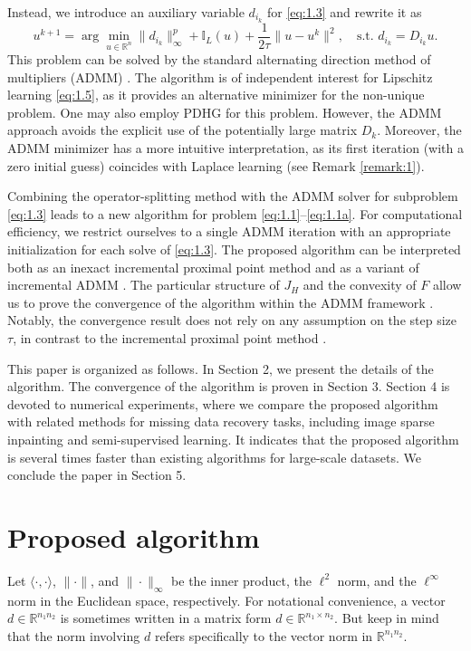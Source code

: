 \documentclass{article}
\theoremstyle{definition}
\begin{document}
Instead, we introduce an auxiliary variable $d_{i_k}$ for \eqref{eq:1.3} and rewrite it as
\begin{equation*}
  u^{k+1}=\arg\min_{u\in\mathbb{R}^n}\|d_{i_k}\|_\infty ^p
  +\mathbb{I}_{L}(u)
  +\frac{1}{2\tau}\|u-u^k\|^2,\quad \mbox{s.t. } d_{i_k}=D_{i_k} u.
\end{equation*}
This problem can be solved by the standard alternating direction method of multipliers (ADMM) \cite{boyd2011distributed}.
The algorithm is of independent interest for Lipschitz learning \eqref{eq:1.5}, as it provides an alternative minimizer for the non-unique problem.
One may also employ PDHG \cite{chambolle2011first} for this problem.
However, the ADMM approach avoids the explicit use of the potentially large matrix $D_k$.
Moreover, the ADMM minimizer has a more intuitive interpretation, as its first iteration (with a zero initial guess) coincides with Laplace learning (see Remark \ref{remark:1}).


Combining the operator-splitting method with the ADMM solver for subproblem \eqref{eq:1.3} leads to a new algorithm for problem \eqref{eq:1.1}--\eqref{eq:1.1a}.
For computational efficiency, we restrict ourselves to a single ADMM iteration with an appropriate initialization for each solve of \eqref{eq:1.3}.
The proposed algorithm can be interpreted both as an inexact incremental proximal point method \cite{bertsekas2011incremental} and as a variant of incremental ADMM \cite{zhang2011unified}.
The particular structure of $J_H$ and the convexity of $F$ allow us to prove the convergence of the algorithm within the ADMM framework \cite{zhang2011unified}.
Notably, the convergence result does not rely on any assumption on the step size $\tau$, in contrast to the incremental proximal point method \cite{bertsekas2011incremental}.


This paper is organized as follows. In Section 2, we present the details of the algorithm.
The convergence of the algorithm is proven in Section 3.
Section 4 is devoted to numerical experiments, where we compare the proposed algorithm with related methods for missing data recovery tasks, including image sparse inpainting and semi-supervised learning.
It indicates that the proposed algorithm is several times faster than existing algorithms for large-scale datasets.
We conclude the paper in Section 5.


\section{Proposed algorithm}
Let $\langle \cdot, \cdot\rangle$, $\|\cdot\|$, and $\|\cdot\|_\infty$ be the inner product, the $\ell^2$ norm, and the $\ell^\infty$ norm in the Euclidean space, respectively.
For notational convenience, a vector $d\in\mathbb{R}^{n_1 n_2}$ is sometimes written in a matrix form $d\in \mathbb{R}^{n_1\times n_2}$. But keep in mind that the norm involving $d$ refers specifically to the vector norm in $\mathbb{R}^{n_1 n_2}$.
\end{document}
